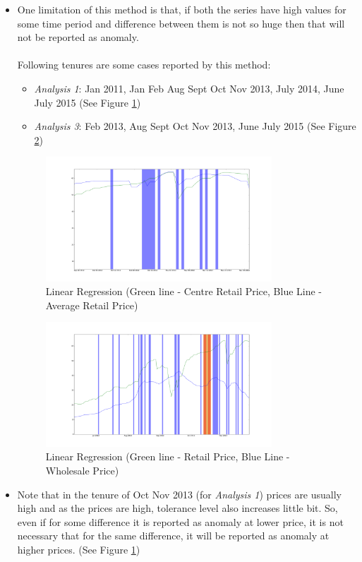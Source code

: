 \begin{itemize}
			\item One limitation of this method is that, if both the series have high values for some time period and difference between them is not so huge then that will not be reported as anomaly.	\\
			\\
			Following tenures are some cases reported by this method:
			\begin{itemize}
				\item \textit{Analysis 1}: Jan 2011, Jan Feb Aug Sept Oct Nov 2013, July 2014, June July 2015 (See Figure \ref{fig:12212})
				\item \textit{Analysis 3}: Feb 2013, Aug Sept Oct Nov 2013, June July 2015 (See Figure \ref{fig:12232})
			\end{itemize}
			\begin{figure}[H]
		    	\centering
  		    	\includegraphics[width=0.8\textwidth]{graphs/12212.png}
		    	\caption{Linear Regression (Green line - Centre Retail Price, Blue Line - Average Retail Price)}
		    	\label{fig:12212}
			\end{figure}
			
			\begin{figure}[H]
		    	\centering
  		    	\includegraphics[width=0.8\textwidth]{graphs/12232.png}
		    	\caption{Linear Regression (Green line - Retail Price, Blue Line - Wholesale Price)}
		    	\label{fig:12232}
			\end{figure}
			
					
			
			\item  Note that in the tenure of Oct Nov 2013 (for \textit{Analysis 1}) prices are usually high and as the prices are high, tolerance level also increases little bit. So, even if for some difference it is reported as anomaly at lower price, it is not necessary that for the same difference, it will be reported as anomaly at higher prices. (See Figure \ref{fig:12212})		
			
		\end{itemize}
		
